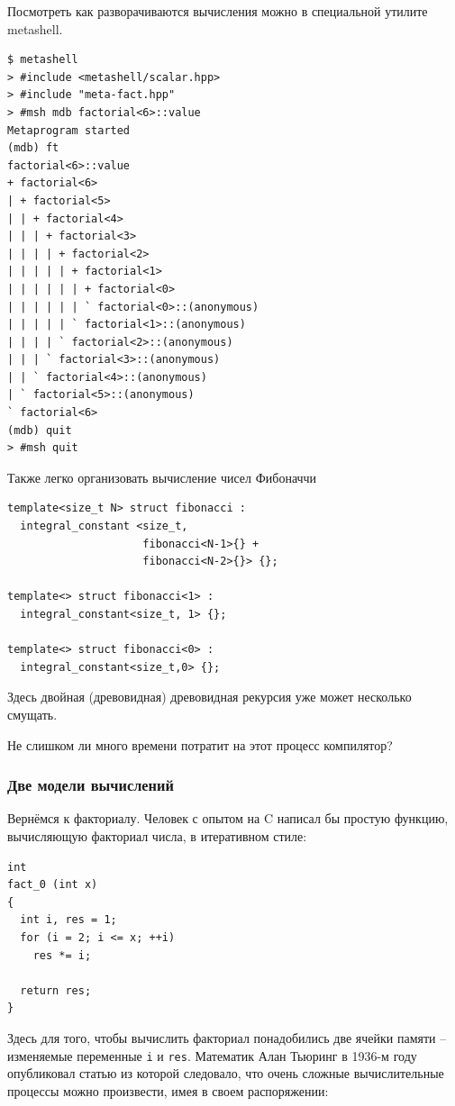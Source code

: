 \documentclass[a4paper,12pt,oneside]{article}
\begin{document}
Посмотреть как разворачиваются вычисления можно в специальной утилите metashell.

\begin{verbatim}
$ metashell
> #include <metashell/scalar.hpp>
> #include "meta-fact.hpp"
> #msh mdb factorial<6>::value
Metaprogram started
(mdb) ft
factorial<6>::value
+ factorial<6> 
| + factorial<5> 
| | + factorial<4> 
| | | + factorial<3> 
| | | | + factorial<2> 
| | | | | + factorial<1> 
| | | | | | + factorial<0> 
| | | | | | ` factorial<0>::(anonymous) 
| | | | | ` factorial<1>::(anonymous) 
| | | | ` factorial<2>::(anonymous) 
| | | ` factorial<3>::(anonymous) 
| | ` factorial<4>::(anonymous) 
| ` factorial<5>::(anonymous) 
` factorial<6> 
(mdb) quit
> #msh quit
\end{verbatim}

Также легко организовать вычисление чисел Фибоначчи

\begin{lstlisting}
template<size_t N> struct fibonacci :
  integral_constant <size_t,
                     fibonacci<N-1>{} +
                     fibonacci<N-2>{}> {};

template<> struct fibonacci<1> : 
  integral_constant<size_t, 1> {};

template<> struct fibonacci<0> : 
  integral_constant<size_t,0> {};
\end{lstlisting}

Здесь двойная (древовидная) древовидная рекурсия уже может несколько смущать.

Не слишком ли много времени потратит на этот процесс компилятор?

\subsubsection{Две модели вычислений}\label{ComputationModels}

Вернёмся к факториалу. Человек с опытом на C написал бы простую функцию, вычисляющую факториал числа, в итеративном стиле:

\begin{lstlisting}
int
fact_0 (int x)
{
  int i, res = 1;
  for (i = 2; i <= x; ++i)
    res *= i;

  return res;
}
\end{lstlisting}

Здесь для того, чтобы вычислить факториал понадобились две ячейки памяти -- изменяемые переменные \lstinline!i! и \lstinline!res!. Математик Алан Тьюринг в 1936-м году опубликовал статью из которой следовало, что очень сложные вычислительные процессы можно произвести, имея в своем распоряжении:
\end{document}
